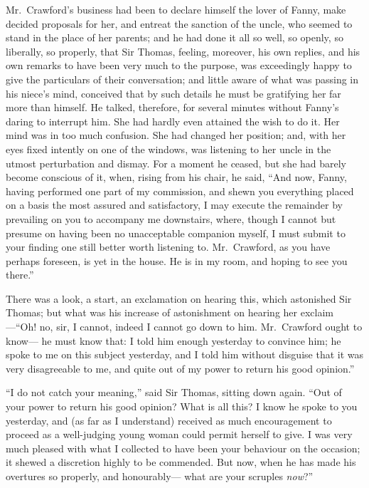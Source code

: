 \documentclass{article}
\begin{document}
Mr.\ Crawford's business had been to declare himself
the lover of Fanny, make decided proposals for her,
and entreat the sanction of the uncle, who seemed to stand
in the place of her parents; and he had done it all so well,
so openly, so liberally, so properly, that Sir Thomas,
feeling, moreover, his own replies, and his own remarks
to have been very much to the purpose, was exceedingly
happy to give the particulars of their conversation;
and little aware of what was passing in his niece's mind,
conceived that by such details he must be gratifying her
far more than himself.  He talked, therefore, for several
minutes without Fanny's daring to interrupt him.
She had hardly even attained the wish to do it.  Her mind
was in too much confusion.  She had changed her position;
and, with her eyes fixed intently on one of the windows,
was listening to her uncle in the utmost perturbation
and dismay.  For a moment he ceased, but she had barely
become conscious of it, when, rising from his chair, he said,
``And now, Fanny, having performed one part of my commission,
and shewn you everything placed on a basis the most assured
and satisfactory, I may execute the remainder by prevailing
on you to accompany me downstairs, where, though I cannot
but presume on having been no unacceptable companion myself,
I must submit to your finding one still better worth
listening to.  Mr.\ Crawford, as you have perhaps foreseen,
is yet in the house.  He is in my room, and hoping to see
you there.''

There was a look, a start, an exclamation on hearing this,
which astonished Sir Thomas; but what was his increase of
astonishment on hearing her exclaim---``Oh! no, sir, I cannot,
indeed I cannot go down to him.  Mr.\ Crawford ought to know---%
he must know that:  I told him enough yesterday to convince him;
he spoke to me on this subject yesterday, and I told him
without disguise that it was very disagreeable to me,
and quite out of my power to return his good opinion.''

``I do not catch your meaning,'' said Sir Thomas, sitting
down again.  ``Out of your power to return his good opinion?
What is all this?  I know he spoke to you yesterday,
and (as far as I understand) received as much encouragement
to proceed as a well-judging young woman could permit
herself to give.  I was very much pleased with what I
collected to have been your behaviour on the occasion;
it shewed a discretion highly to be commended.  But now,
when he has made his overtures so properly, and honourably---%
what are your scruples \emph{now}?''
\end{document}

